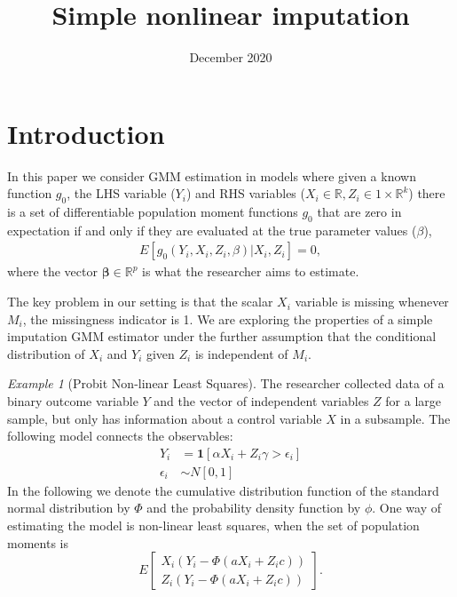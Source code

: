 \documentclass{article}
\title{Simple nonlinear imputation}
\author{}
\date{December 2020}
\theoremstyle{definition}
\theoremstyle{remark}
\newtheorem{example}{Example}
\begin{document}
\maketitle

\onehalfspacing


\section{Introduction}
In this paper we consider GMM estimation in models where given a known function $g_0$, the LHS variable ($Y_i$) and RHS variables ($X_i \in \mathbb{R},Z_i \in {1} \times \mathbb{R}^k$) there is a set of {\color{red}differentiable} population moment functions $g_0$ that are zero in expectation if and only if they are evaluated at the true parameter values ($\beta$),
\begin{align}
E[g_0(Y_i, X_i, Z_i,\beta)|X_i,Z_i] = 0,
\end{align}
where the vector $\mathbf{\beta}\in \mathbb{R}^{p}$ is what the researcher aims to estimate.

The key problem in our setting is that the scalar $X_i$ variable is missing whenever $M_i$, the missingness indicator is 1. We are exploring the properties of a simple imputation GMM estimator under the further assumption that the conditional distribution of $X_i$ and $Y_i$ given $Z_i$ is independent of $M_i$. 

\begin{example}[Probit Non-linear Least Squares]
	The researcher collected data of a binary outcome variable $Y$ and the vector of independent variables $Z$ for a large sample, but only has information about a control variable $X$ in a subsample. The following model connects the observables:
	\begin{align}
	Y_i&= \mathbf{1}[\alpha X_i + Z_i\gamma>\epsilon_i] \label{eq_probitEx1}\\
	\epsilon_i&\sim N[0,1] \label{eq_probitEx2}
	\end{align}
	In the following we denote the cumulative distribution function of the standard normal distribution by $\Phi$ and the probability density function by $\phi$. One way of estimating the model is non-linear least squares, when the set of population moments is
	\[E\left[\begin{array}{c}
	X_i(Y_i-\Phi(aX_i+Z_ic))\\
	Z_i(Y_i-\Phi(aX_i+Z_ic))
	\end{array}
	\right].
	\]
\end{example}
\end{document}
